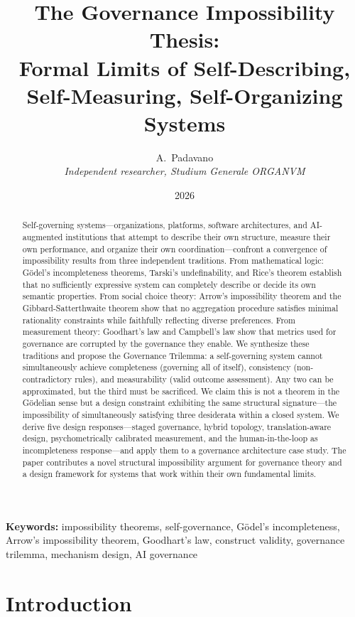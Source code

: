 \documentclass[12pt,a4paper]{article}
\title{The Governance Impossibility Thesis:\\Formal Limits of Self-Describing,\\Self-Measuring, Self-Organizing Systems}
\author{A.~Padavano\\
  \textit{Independent researcher, Studium Generale ORGANVM}}
\date{2026}
\begin{document}
\maketitle

\begin{abstract}
Self-governing systems---organizations, platforms, software architectures, and
AI-augmented institutions that attempt to describe their own structure, measure
their own performance, and organize their own coordination---confront a
convergence of impossibility results from three independent traditions. From
mathematical logic: G\"{o}del's incompleteness theorems, Tarski's
undefinability, and Rice's theorem establish that no sufficiently expressive
system can completely describe or decide its own semantic properties. From
social choice theory: Arrow's impossibility theorem and the
Gibbard-Satterthwaite theorem show that no aggregation procedure satisfies
minimal rationality constraints while faithfully reflecting diverse
preferences. From measurement theory: Goodhart's law and Campbell's law show
that metrics used for governance are corrupted by the governance they enable.
We synthesize these traditions and propose the Governance Trilemma: a
self-governing system cannot simultaneously achieve completeness (governing all
of itself), consistency (non-contradictory rules), and measurability (valid
outcome assessment). Any two can be approximated, but the third must be
sacrificed. We claim this is not a theorem in the G\"{o}delian sense but a
design constraint exhibiting the same structural signature---the impossibility
of simultaneously satisfying three desiderata within a closed system. We
derive five design responses---staged governance, hybrid topology,
translation-aware design, psychometrically calibrated measurement, and the
human-in-the-loop as incompleteness response---and apply them to a governance
architecture case study. The paper contributes a novel structural
impossibility argument for governance theory and a design framework for
systems that work within their own fundamental limits.
\end{abstract}

\noindent\textbf{Keywords:} impossibility theorems, self-governance,
G\"{o}del's incompleteness, Arrow's impossibility theorem, Goodhart's law,
construct validity, governance trilemma, mechanism design, AI governance

\bigskip

\section{Introduction}
\end{document}
